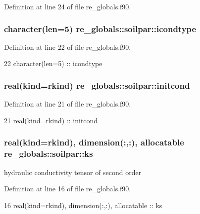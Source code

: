 Definition at line 24 of file re\+\_\+globals.\+f90.

\subsubsection[{icondtype}]{\setlength{\rightskip}{0pt plus 5cm}character(len=5) re\+\_\+globals\+::soilpar\+::icondtype}\label{structre__globals_1_1soilpar_a23ca48cc5d797bd1a06caf8c00e2f14d}


Definition at line 22 of file re\+\_\+globals.\+f90.


\begin{DoxyCode}
22     \textcolor{keywordtype}{character(len=5)} :: icondtype
\end{DoxyCode}
\subsubsection[{initcond}]{\setlength{\rightskip}{0pt plus 5cm}real(kind=rkind) re\+\_\+globals\+::soilpar\+::initcond}\label{structre__globals_1_1soilpar_aeb995ffc45073c05e569e8d11fbeb9ee}


Definition at line 21 of file re\+\_\+globals.\+f90.


\begin{DoxyCode}
21     \textcolor{keywordtype}{real(kind=rkind)} :: initcond
\end{DoxyCode}
\subsubsection[{ks}]{\setlength{\rightskip}{0pt plus 5cm}real(kind=rkind), dimension(\+:,\+:), allocatable re\+\_\+globals\+::soilpar\+::ks}\label{structre__globals_1_1soilpar_ac677c58ce59b59d36e17ea3ecce8c204}


hydraulic conductivity tensor of second order 



Definition at line 16 of file re\+\_\+globals.\+f90.


\begin{DoxyCode}
16     \textcolor{keywordtype}{real(kind=rkind)}, \textcolor{keywordtype}{dimension(:,:)}, \textcolor{keywordtype}{allocatable} :: ks
\end{DoxyCode}
